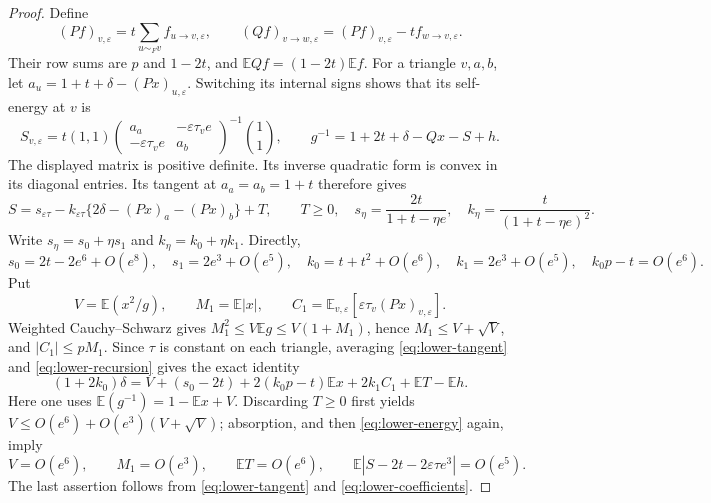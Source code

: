 \documentclass[10pt]{article}
\numberwithin{equation}{section}
\newcommand{\1}{\mathbf1}
\begin{document}
\begin{proof}
Define
\[
 (Pf)_{v,\varepsilon}=t\sum_{u\sim_Fv}f_{u\to v,\varepsilon},
 \qquad (Qf)_{v\to w,\varepsilon}=(Pf)_{v,\varepsilon}
                                  -tf_{w\to v,\varepsilon}.
\]
Their row sums are $p$ and $1-2t$, and
$\mathbb EQf=(1-2t)\mathbb Ef$. For a triangle $v,a,b$, let
$a_u=1+t+\delta-(Px)_{u,\varepsilon}$. Switching its internal signs
shows that its self-energy at $v$ is
\begin{equation}\label{eq:lower-recursion}
 S_{v,\varepsilon}
 =t(1,1)\begin{pmatrix}a_a&-\varepsilon\tau_ve\\
                  -\varepsilon\tau_ve&a_b\end{pmatrix}^{-1}\binom11,
 \qquad
 g^{-1}=1+2t+\delta-Qx-S+h.
\end{equation}
The displayed matrix is positive definite. Its inverse quadratic
form is convex in its diagonal entries. Its tangent at
$a_a=a_b=1+t$ therefore gives
\begin{equation}\label{eq:lower-tangent}
 S=s_{\varepsilon\tau}
   -k_{\varepsilon\tau}\{2\delta-(Px)_a-(Px)_b\}+T,\qquad T\ge0,
 \quad
 s_\eta=\frac{2t}{1+t-\eta e},\quad
 k_\eta=\frac{t}{(1+t-\eta e)^2}.
\end{equation}
Write $s_\eta=s_0+\eta s_1$ and $k_\eta=k_0+\eta k_1$. Directly,
\begin{equation}\label{eq:lower-coefficients}
 s_0=2t-2e^6+O(e^8),\quad
 s_1=2e^3+O(e^5),\quad k_0=t+t^2+O(e^6),\quad
 k_1=2e^3+O(e^5),\quad k_0p-t=O(e^6).
\end{equation}
Put
\[
 V=\mathbb E(x^2/g),\qquad M_1=\mathbb E|x|,\qquad
 C_1=\mathbb E_{v,\varepsilon}[\varepsilon\tau_v(Px)_{v,\varepsilon}].
\]
Weighted Cauchy--Schwarz gives
$M_1^2\le V\mathbb Eg\le V(1+M_1)$, hence
$M_1\le V+\sqrt V$, and $|C_1|\le pM_1$.
Since $\tau$ is constant on each triangle, averaging
\eqref{eq:lower-tangent} and \eqref{eq:lower-recursion} gives the exact identity
\begin{equation}\label{eq:lower-energy}
 (1+2k_0)\delta
 =V+(s_0-2t)+2(k_0p-t)\mathbb Ex+2k_1C_1+\mathbb ET-\mathbb Eh.
\end{equation}
Here one uses $\mathbb E(g^{-1})=1-\mathbb Ex+V$.
Discarding $T\ge0$ first yields
$V\le O(e^6)+O(e^3)(V+\sqrt V)$; absorption, and then
\eqref{eq:lower-energy} again, imply
\begin{equation}\label{eq:lower-small}
 V=O(e^6),\qquad M_1=O(e^3),\qquad\mathbb ET=O(e^6),\qquad
 \mathbb E|S-2t-2\varepsilon\tau e^3|=O(e^5).
\end{equation}
The last assertion follows from \eqref{eq:lower-tangent} and
\eqref{eq:lower-coefficients}.


\end{proof}
\end{document}
